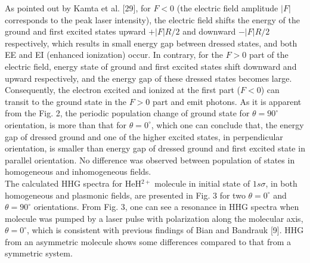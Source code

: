 \documentclass[%
reprint,
twocolumn,
 amsmath,amssymb,
 aps,
pra,
 showpacs
]{revtex4-1}
\begin{document}
\begin{figure*}[ht]
\begin{center}
\centering
{}
\caption{
\label{HHG} 
(Color online) Populations of ground and first excited states and electron probability density (norm) of HeH$^{2+}$ and H$2^{+}$ molecules as a function of time, under a 10-cycle laser pulse of 800 nm wavelength ($\omega=0.057$ a.u.) and $I$=3$\times 10^{14}$ W/cm$^2$ intensity, with first excited state as the initial wavefunction, for two relative orientations of the laser polarization and molecular axis, $\theta=0^{\circ}$ and $\theta=90^{\circ}$.}
\end{center}
\end{figure*}
As pointed out by Kamta et al. [29], for $F<0$ (the electric field amplitude $\vert F\vert$ corresponds to the peak laser intensity), the electric field shifts the energy of the ground and first excited states upward $+\vert F\vert R/2$ and downward $-\vert F\vert R/2$ respectively, which results in small energy gap between dressed states, and both EE and EI (enhanced ionization) occur. In contrary, for the $F>0$ part of the electric field, energy state of ground and first excited states shift downward and upward respectively, and the energy gap of these dressed states becomes large. Consequently, the electron excited and ionized at the first part ($F<0$) can transit to the ground state in the $F>0$ part and emit photons. As it is apparent from the Fig. 2, the periodic population change of ground state for $\theta=90^{\circ}$ orientation, is more than that for $\theta=0^{\circ}$, which one can conclude that, the energy gap of dressed ground and one of the higher excited states, in perpendicular orientation, is smaller than energy gap of dressed ground and first excited state in parallel orientation.
No difference was observed between population of states in homogeneous and inhomogeneous fields.\\
\hspace*{0.4 mm} The calculated HHG spectra for HeH$^{2+}$ molecule in initial state of $1s\sigma$, in both homogeneous and plasmonic fields, are presented in Fig. 3 for two $\theta=0^{\circ}$ and $\theta=90^{\circ}$ orientations.
From Fig. 3, one can see a resonance in HHG spectra when molecule was pumped by a laser pulse with polarization along the molecular axis, $\theta=0^{\circ}$, which is consistent with previous findings of Bian and Bandrauk [9]. HHG from an asymmetric molecule shows some differences compared to that from a symmetric system.
\end{document}
